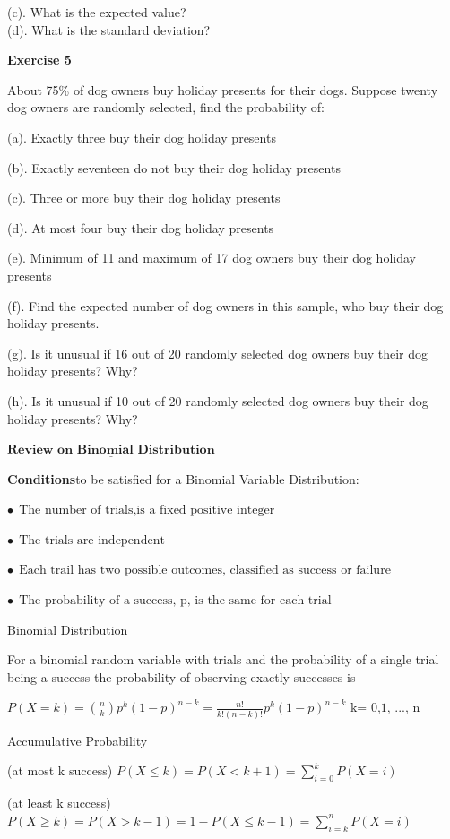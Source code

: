 \documentclass[
]{book}
\begin{document}
(c). What is the expected value?\\
(d). What is the standard deviation?

\textbf{Exercise 5}

About 75\% of dog owners buy holiday presents for their dogs. Suppose twenty dog owners are randomly selected, find the probability of:

(a). Exactly three buy their dog holiday presents

(b). Exactly seventeen do not buy their dog holiday presents

(c). Three or more buy their dog holiday presents

(d). At most four buy their dog holiday presents

(e). Minimum of 11 and maximum of 17 dog owners buy their dog holiday presents

(f). Find the expected number of dog owners in this sample, who buy their dog holiday presents.

(g). Is it unusual if 16 out of 20 randomly selected dog owners buy their dog holiday presents? Why?

(h). Is it unusual if 10 out of 20 randomly selected dog owners buy their dog holiday presents? Why?

\(\underline{\textbf{Review on Binomial Distribution}}\)

\textbf{Conditions}to be satisfied for a Binomial Variable Distribution:

\(\bullet \ \ \text{The number of trials,is a fixed positive integer}\)

\(\bullet \ \ \text{The trials are independent}\)

\(\bullet \ \ \text{Each trail has two possible outcomes, classified as success or failure}\)

\(\bullet \ \ \text{The probability of a success, p, is the same for each trial}\)

Binomial Distribution

For a binomial random variable with trials and the probability of a single trial being a success the probability of observing exactly successes is

\(P(X =k) = \binom nkp^k(1-p)^{n-k}=\frac{n!}{k! (n-k)!}p^k(1-p)^{n-k} \text{  k= 0,1, ..., n}\)

Accumulative Probability

(at most k success) \(P(X\le k)=P(X <k+1)=\sum_{i=0}^{k}P(X=i)\)

(at least k success) \(P(X\ge k)=P(X>k-1)=1-P(X\le k-1)=\sum_{i=k}^n P(X=i)\)
\end{document}
